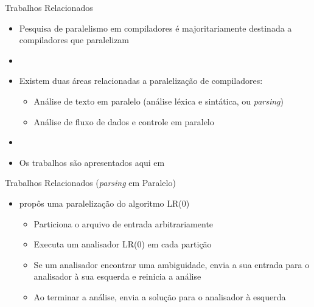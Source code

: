 \begin{frame}{Trabalhos Relacionados}
    \begin{itemize}
        \item Pesquisa de paralelismo em compiladores é majoritariamente destinada a compiladores que paralelizam
        \item[]
        \item Existem duas áreas relacionadas a paralelização de compiladores:
        \begin{itemize}
            \item Análise de texto em paralelo (análise léxica e sintática, ou \textit{parsing})
            \item Análise de fluxo de dados e controle em paralelo
        \end{itemize}
        \item[]
        \item Os trabalhos são apresentados aqui em {\color{blue}{ordem cronológica}}
    \end{itemize}
\end{frame}

\begin{frame}{Trabalhos Relacionados (\textit{parsing} em Paralelo)}
    \begin{itemize}
        \item \cite{Mickunas:1978:PCM:800127.804105} propôs uma paralelização do algoritmo LR(0)
            \begin{itemize}
                \item Particiona o arquivo de entrada arbitrariamente
                \item Executa um analisador LR(0) em cada partição
                \item Se um analisador encontrar uma ambiguidade, envia a sua entrada para o analisador à sua esquerda e reinicia a análise
                \item Ao terminar a análise, envia a solução para o analisador à esquerda
            \end{itemize}
    \end{itemize}
\end{frame}

